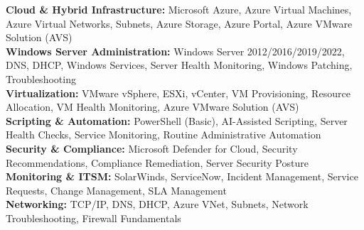 \documentclass[letterpaper,10pt]{article}
\begin{document}
\begin{itemize}[leftmargin=0in, label={}]
\small{\item{

\textbf{Cloud \& Hybrid Infrastructure:}
Microsoft Azure, Azure Virtual Machines, Azure Virtual Networks, Subnets, Azure Storage, Azure Portal, Azure VMware Solution (AVS) \\

\textbf{Windows Server Administration:}
Windows Server 2012/2016/2019/2022, DNS, DHCP, Windows Services, Server Health Monitoring, Windows Patching, Troubleshooting \\

\textbf{Virtualization:}
VMware vSphere, ESXi, vCenter, VM Provisioning, Resource Allocation, VM Health Monitoring, Azure VMware Solution (AVS) \\

\textbf{Scripting \& Automation:}
PowerShell (Basic), AI-Assisted Scripting, Server Health Checks, Service Monitoring, Routine Administrative Automation \\

\textbf{Security \& Compliance:}
Microsoft Defender for Cloud, Security Recommendations, Compliance Remediation, Server Security Posture \\

\textbf{Monitoring \& ITSM:}
SolarWinds, ServiceNow, Incident Management, Service Requests, Change Management, SLA Management \\

\textbf{Networking:}
TCP/IP, DNS, DHCP, Azure VNet, Subnets, Network Troubleshooting, Firewall Fundamentals

}}
\end{itemize}


\end{document}
